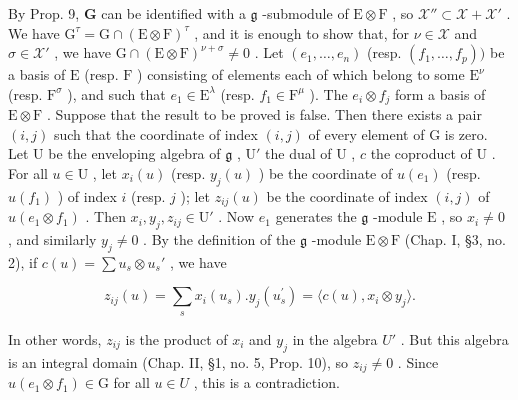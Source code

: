 By Prop. 9, \(\mathbf{G}\) can be identified with a \(\mathfrak{g}\) -submodule of \(\mathrm{E} \otimes \mathrm{F}\) , so \(\mathcal{X}'' \subset \mathcal{X} + \mathcal{X}'\) . We have \(\mathrm{G}^{\tau} = \mathrm{G} \cap (\mathrm{E} \otimes \mathrm{F})^{\tau}\) , and it is enough to show that, for \(\nu \in \mathcal{X}\) and \(\sigma \in \mathcal{X}'\) , we have \(\mathrm{G} \cap (\mathrm{E} \otimes \mathrm{F})^{\nu + \sigma} \neq 0\) . Let \((e_1, \ldots, e_n)\) (resp. \((f_1, \ldots, f_p))\) be a basis of \(\mathrm{E}\) (resp. \(\mathrm{F}\) ) consisting of elements each of which belong to some \(\mathrm{E}^\nu\) (resp. \(\mathrm{F}^\sigma\) ), and such that \(e_1 \in \mathrm{E}^\lambda\) (resp. \(f_1 \in \mathrm{F}^\mu\) ). The \(e_i \otimes f_j\) form a basis of \(\mathrm{E} \otimes \mathrm{F}\) . Suppose that the result to be proved is false. Then there exists a pair \((i,j)\) such that the coordinate of index \((i,j)\) of every element of \(\mathrm{G}\) is zero. Let \(\mathrm{U}\) be the enveloping algebra of \(\mathfrak{g}\) , \(\mathrm{U}'\) the dual of \(\mathrm{U}\) , \(c\) the coproduct of \(\mathrm{U}\) . For all \(u \in \mathrm{U}\) , let \(x_i(u)\) (resp. \(y_j(u)\) ) be the coordinate of \(u(e_1)\) (resp. \(u(f_1)\) ) of index \(i\) (resp. \(j\) ); let \(z_{ij}(u)\) be the coordinate of index \((i,j)\) of \(u(e_1 \otimes f_1)\) . Then \(x_i, y_j, z_{ij} \in \mathrm{U}'\) . Now \(e_1\) generates the \(\mathfrak{g}\) -module \(\mathrm{E}\) , so \(x_i \neq 0\) , and similarly \(y_j \neq 0\) . By the definition of the \(\mathfrak{g}\) -module \(\mathrm{E} \otimes \mathrm{F}\) (Chap. I, §3, no. 2), if \(c(u) = \sum u_s \otimes u_s'\) , we have

\[
z _ {i j} (u) = \sum_ {s} x _ {i} (u _ {s}). y _ {j} (u _ {s} ^ {\prime}) = \langle c (u), x _ {i} \otimes y _ {j} \rangle .
\]

In other words, \(z_{ij}\) is the product of \(x_{i}\) and \(y_{j}\) in the algebra \(U'\) . But this algebra is an integral domain (Chap. II, §1, no. 5, Prop. 10), so \(z_{ij} \neq 0\) . Since \(u(e_{1} \otimes f_{1}) \in \mathrm{G}\) for all \(u \in U\) , this is a contradiction.


